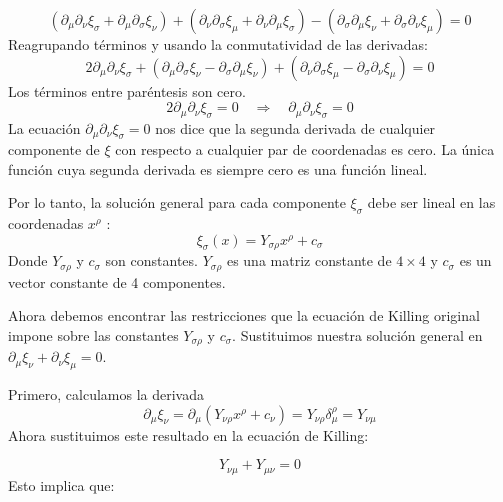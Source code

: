 \begin{equation}
    \left(\partial_\mu \partial_\nu \xi_\sigma+\partial_\mu \partial_\sigma \xi_\nu\right)+\left(\partial_\nu \partial_\sigma \xi_\mu+\partial_\nu \partial_\mu \xi_\sigma\right)-\left(\partial_\sigma \partial_\mu \xi_\nu+\partial_\sigma \partial_\nu \xi_\mu\right)=0
\end{equation}
Reagrupando términos y usando la conmutatividad de las derivadas:
\begin{equation}
    2 \partial_\mu \partial_\nu \xi_\sigma+\left(\partial_\mu \partial_\sigma \xi_\nu-\partial_\sigma \partial_\mu \xi_\nu\right)+\left(\partial_\nu \partial_\sigma \xi_\mu-\partial_\sigma \partial_\nu \xi_\mu\right)=0
\end{equation}
Los términos entre paréntesis son cero.
\begin{equation}
    2 \partial_\mu \partial_\nu \xi_\sigma=0 \quad \Longrightarrow \quad \partial_\mu \partial_\nu \xi_\sigma=0
\end{equation}
La ecuación $\partial_\mu \partial_\nu \xi_\sigma=0$ nos dice que la segunda derivada de cualquier componente de $\xi$ con respecto a cualquier par de coordenadas es cero. La única función cuya segunda derivada es siempre cero es una función lineal.

Por lo tanto, la solución general para cada componente $\xi_\sigma$ debe ser lineal en las coordenadas $x^\rho$ :
\begin{equation}
    \xi_\sigma(x)=Y_{\sigma \rho} x^\rho+c_\sigma
\end{equation}
Donde $Y_{\sigma \rho}$ y $c_\sigma$ son constantes. $Y_{\sigma \rho}$ es una matriz constante de $4 \times 4$ y $c_\sigma$ es un vector constante de 4 componentes.

Ahora debemos encontrar las restricciones que la ecuación de Killing original impone sobre las constantes $Y_{\sigma \rho}$ y $c_\sigma$. Sustituimos nuestra solución general en $\partial_\mu \xi_\nu+\partial_\nu \xi_\mu=0$.

Primero, calculamos la derivada
\begin{equation}
    \partial_\mu \xi_\nu=\partial_\mu\left(Y_{\nu \rho} x^\rho+c_\nu\right)=Y_{\nu \rho} \delta_\mu^\rho=Y_{\nu \mu}
\end{equation}
Ahora sustituimos este resultado en la ecuación de Killing:

\begin{equation}
    Y_{\nu \mu}+Y_{\mu \nu}=0
\end{equation}
Esto implica que:

